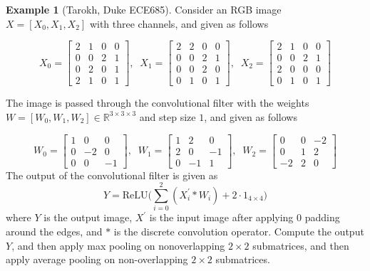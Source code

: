 \documentclass{article}
\theoremstyle{definition}
\newtheorem{example}{Example}[section]
\theoremstyle{remark}
\theoremstyle{definition}
\begin{document}
    \begin{example}[Tarokh, Duke ECE685]
        Consider an RGB image $X = [X_0, X_1, X_2]$ with three channels, and given as follows 

        \begin{equation}
          X_0 = \begin{bmatrix} 2 & 1 & 0 & 0 \\ 0 & 0 & 2 & 1 \\ 0 & 2 & 0 & 1 \\ 2 & 1 & 0 & 1 \end{bmatrix}, \;\; 
          X_1 = \begin{bmatrix} 2 & 2 & 0 & 0 \\ 0 & 0 & 2 & 1 \\ 0 & 0 & 2 & 0 \\ 0 & 1 & 0 & 1 \end{bmatrix}, \;\; 
          X_2 = \begin{bmatrix} 2 & 1 & 0 & 0 \\ 0 & 0 & 2 & 1 \\ 2 & 0 & 0 & 0 \\ 0 & 1 & 0 & 1 \end{bmatrix}
          \label{eq:tarokh_conv_exercise}
        \end{equation}
        
        The image is passed through the convolutional filter with the weights $W = [W_0, W_1, W_2] \in \mathbb{R}^{3 \times 3 \times 3}$ and step size $1$, and given as follows 

        \begin{equation}
          W_0 = \begin{bmatrix} 1 & 0 & 0 \\ 0 & -2 & 0 \\ 0 & 0 & -1 \end{bmatrix}, \;\; 
          W_1 = \begin{bmatrix} 1 & 2 & 0 \\ 2 & 0 & - 1 \\ 0 & -1 & 1 \end{bmatrix}, \;\; 
          W_2 = \begin{bmatrix} 0 & 0 & -2 \\ 0 & 1 & 2 \\ -2 & 2 & 0 \end{bmatrix} 
          \label{eq:tarokh_conv_exercise2}
        \end{equation}   
        The output of the convolutional filter is given as 
        \[Y = \mathrm{ReLU} \bigg( \sum_{i=0}^2 (X_i^\prime \ast W_i) + 2 \cdot 1_{4 \times 4}\bigg)\]
        where $Y$ is the output image, $X^\prime$ is the input image after applying $0$ padding around the edges, and $\ast$ is the discrete convolution operator. Compute the output $Y$, and then apply max pooling on nonoverlapping $2 \times 2$ submatrices, and then apply average pooling on non-overlapping $2 \times 2$ submatrices. 
    \end{example}
\end{document}
